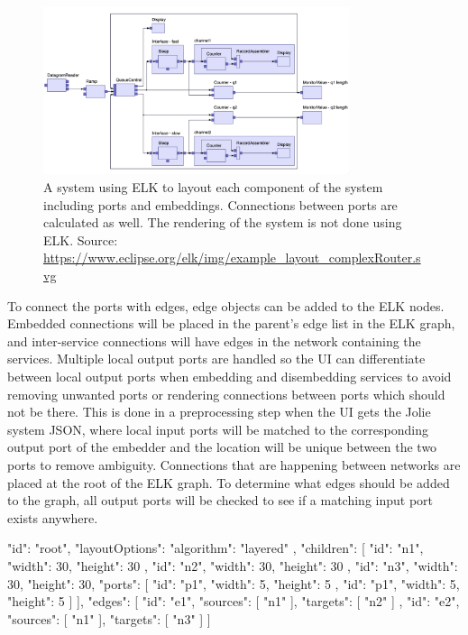 \begin{figure}[t]
    \center
    \includegraphics[width=0.80\textwidth]{figures/elk.png}
    \caption{A system using ELK to layout each component of the system including ports and embeddings. Connections between ports are calculated as well. The rendering of the system is not done using ELK. Source: \url{https://www.eclipse.org/elk/img/example_layout_complexRouter.svg}}
    \label{figure:elk_example}
\end{figure}

To connect the ports with edges, edge objects can be added to the ELK nodes. Embedded connections will be placed in the parent's edge list in the ELK graph, and inter-service connections will have edges in the network containing the services.
Multiple local output ports are handled so the UI can differentiate between local output ports when embedding and disembedding services to avoid removing unwanted ports or rendering connections between ports which should not be there.
This is done in a preprocessing step when the UI gets the Jolie system JSON, where local input ports will be matched to the corresponding output port of the embedder and the location will be unique between the two ports to remove ambiguity.
Connections that are happening between networks are placed at the root of the ELK graph. To determine what edges should be added to the graph, all output ports will be checked to see if a matching input port exists anywhere.

\begin{jsonlisting}[][caption={The ELK JSON format}, label={lst:elk_json}]
    {
        "id": "root",
        "layoutOptions": { "algorithm": "layered" },
        "children": [
            { "id": "n1", "width": 30, "height": 30 },
            { "id": "n2", "width": 30, "height": 30 },
            {
                "id": "n3",
                "width": 30,
                "height": 30,
                "ports": [
                    { "id": "p1", "width": 5, "height": 5 },
                    { "id": "p1", "width": 5, "height": 5 }
                ]
            }
        ],
        "edges": [
            { "id": "e1", "sources": [ "n1" ], "targets": [ "n2" ] },
            { "id": "e2", "sources": [ "n1" ], "targets": [ "n3" ] }
        ]
    }
\end{jsonlisting}


